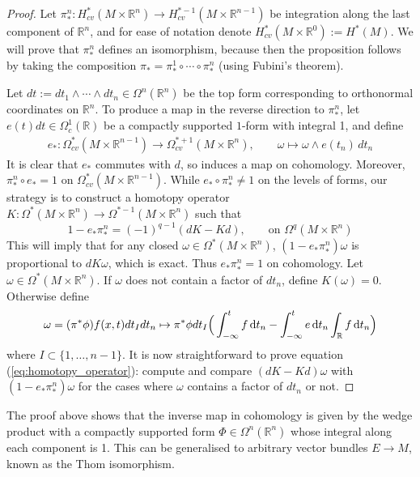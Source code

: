 \begin{proof} %
	Let $\pi^n_* : H_{cv}^*(M\times \mathbb{R}^n) \to H_{cv}^{*-1}(M\times
	\mathbb{R}^{n-1})$ be integration along the last component of
	$\mathbb{R}^n$, and for ease of notation denote $H_{cv}^*(M\times
	\mathbb{R}^0) := H^*(M)$. We will prove that $\pi^n_*$ defines an
	isomorphism, because then the proposition follows by taking the composition
	$\pi_* = \pi^1_* \circ \cdots\circ \pi^n_*$ (using Fubini's theorem).

	Let $dt:=dt_1\wedge \cdots\wedge dt_n\in\Omega^n(\mathbb{R}^n)$ be the top 
	form corresponding to orthonormal coordinates on $\mathbb{R}^n$. 
	To produce a map in the reverse direction to $\pi^n_*$, let $e(t)dt \in
	\Omega^1_c(\mathbb{R})$ be a compactly supported $1$-form with integral 1,
	and define 
	\begin{align*}
	e_* : \Omega_{cv}^*(M\times \mathbb{R}^{n-1}) \to 
	\Omega^{*+1}_{cv}(M\times \mathbb{R}^n), \qquad  
	\omega \mapsto \omega \wedge e(t_n)\, dt_n 
	\end{align*}
	It is clear that $e_*$ commutes with  $d$, so induces a map on cohomology.
	Moreover,  $\pi_*^n \circ e_* = 1$ on  $\Omega_{cv}^*(M\times
	\mathbb{R}^{n-1})$. While $e_*\circ
	\pi_*^n \neq 1$ on the levels of forms, our strategy is to construct a
	homotopy operator  $K:\Omega^{*}(M\times \mathbb{R}^n) \to
	\Omega^{*-1}(M\times \mathbb{R}^n)$ such that 
	\begin{equation} \label{eq:homotopy_operator}
		1-e_*\pi_*^n = (-1)^{q-1}(dK-Kd), \qquad 
		\text{on } \Omega^q(M\times \mathbb{R}^n)
	\end{equation}
	This will imply that for any closed $\omega \in \Omega^*(M\times
	\mathbb{R}^n)$, $(1-e_*\pi_*^n)\omega$ is proportional to  $dK\omega$, 
	which is exact. Thus $e_*\pi_*^n=1$ on cohomology.
	Let $\omega \in \Omega^*(M\times \mathbb{R}^n)$. If $\omega$ does not 
	contain a factor of  $dt_n$, define $K(\omega) = 0$. Otherwise define 
	\[
		\omega = (\pi^*\phi) f(x,t) dt_I dt_n \mapsto 
		\pi^*\phi dt_I\paren[2]{\int_{-\infty}^t f \odif{t_n} 
		- \int_{-\infty}^t e \odif{t_n} \int_{\mathbb{R}} f \odif{t_n}}
	\] 
	where $I \subset \{1,\ldots,n-1\}$.
	It is now straightforward to prove equation (\ref{eq:homotopy_operator}):
	compute and compare $(dK-Kd)\omega$ with $(1-e_*\pi_*^n)\omega$ for the cases 
	where $\omega$ contains a factor of $dt_n$ or not.
\end{proof}
The proof above shows that the inverse map in cohomology is given by the wedge
product with a compactly supported form $\Phi \in \Omega^{n}(\mathbb{R}^n)$ 
whose integral along each component is 1. This can be generalised to arbitrary 
vector bundles $E\to M$, known as the Thom isomorphism. 

